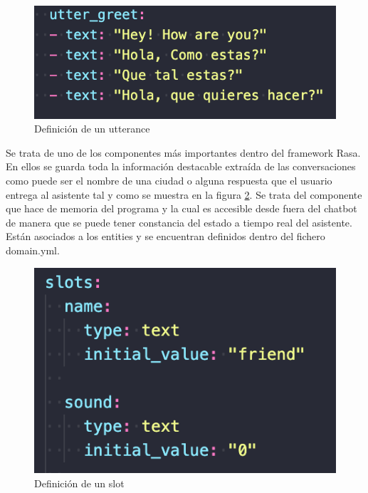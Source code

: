 \begin{figure}[H]
    \centering
    \includegraphics[scale=0.6]{include/capturas/RasaUtterance.png}
    \caption{Definición de un utterance}
    \label{fig:rasa_utterance}
\end{figure}
\vspace{1cm}


Se trata de uno de los componentes más importantes dentro del framework Rasa. En ellos se guarda toda la información destacable extraída de las conversaciones como puede ser el nombre de una ciudad o alguna respuesta que el usuario entrega al asistente tal y como se muestra en la figura \ref{fig:rasa_slot}. Se trata del componente que hace de memoria del programa y la cual es accesible desde fuera del chatbot de manera que se puede tener constancia del estado a tiempo real del asistente. Están asociados a los entities y se encuentran definidos dentro del fichero domain.yml.

\begin{figure}[H]
    \centering
    \includegraphics[scale=0.7]{include/capturas/RasaSlot.png}
    \caption{Definición de un slot}
    \label{fig:rasa_slot}
\end{figure}

